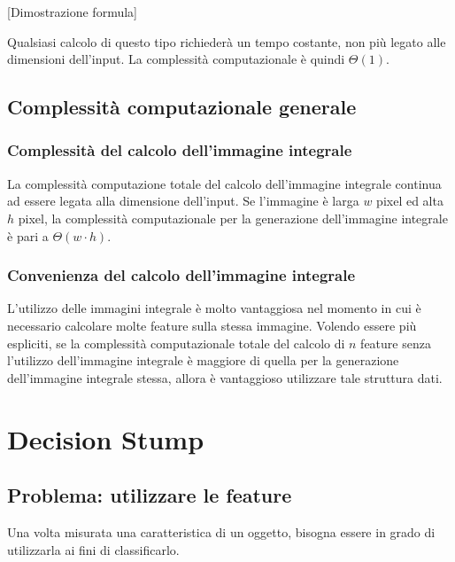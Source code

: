                 [Dimostrazione formula]

                Qualsiasi calcolo di questo tipo richiederà un tempo costante, non più legato alle dimensioni dell'input.
                La complessità computazionale è quindi $\Theta(1)$.

        \subsection{Complessità computazionale generale}
            \subsubsection{Complessità del calcolo dell'immagine integrale}
            La complessità computazione totale del calcolo dell'immagine integrale continua ad essere legata alla dimensione dell'input.
            Se l'immagine è larga $w$ pixel ed alta $h$ pixel, la complessità computazionale per la generazione dell'immagine integrale è pari a $\Theta(w \cdot h)$.

            \subsubsection{Convenienza del calcolo dell'immagine integrale}
            L'utilizzo delle immagini integrale è molto vantaggiosa nel momento in cui è necessario calcolare molte feature sulla stessa immagine.
            Volendo essere più espliciti, se la complessità computazionale totale del calcolo di $n$ feature senza l'utilizzo dell'immagine integrale è maggiore di quella per la generazione dell'immagine integrale stessa, allora è vantaggioso utilizzare tale struttura dati.

    \section{Decision Stump}
    \label{sec:decision_stump}
        \subsection{Problema: utilizzare le feature}
            Una volta misurata una caratteristica di un oggetto, bisogna essere in grado di utilizzarla ai fini di classificarlo.

